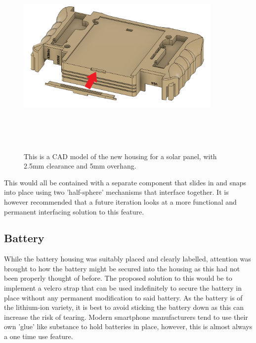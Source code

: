\begin{figure} [h]
    \centering
    \includegraphics[width=10cm,height=10cm,keepaspectratio]{Figures/solar_new.png}
    \caption{This is a CAD model of the new housing for a solar panel, with 2.5mm clearance and 5mm overhang.}
    \label{fig:NewSolar}
    \end{figure}

This would all be contained with a separate component that slides in and snaps into place using two 'half-sphere' mechanisms that interface together.
It is however recommended that a future iteration looks at a more functional and permanent interfacing solution to this feature.

\subsection{Battery} \label{New Battery}

While the battery housing was suitably placed and clearly labelled, attention was brought to how the battery might be secured into the housing as this had not been properly thought of before.
The proposed solution to this would be to implement a velcro strap that can be used indefinitely to secure the battery in place without any permanent modification to said battery.
As the battery is of the lithium-ion variety, it is best to avoid sticking the battery down as this can increase the risk of tearing.
Modern smartphone manufacturers tend to use their own 'glue' like substance to hold batteries in place, however, this is almost always a one time use feature.

